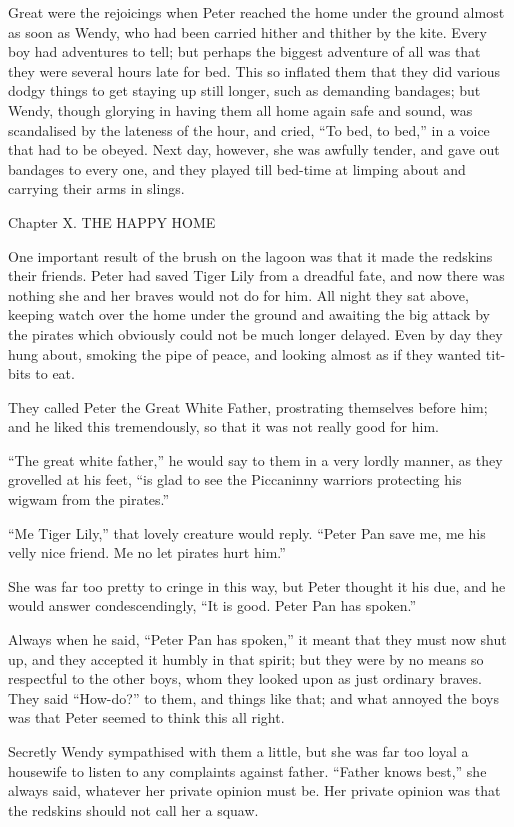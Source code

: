 Great were the rejoicings when Peter reached the home under the ground
almost as soon as Wendy, who had been carried hither and thither by the
kite. Every boy had adventures to tell; but perhaps the biggest
adventure of all was that they were several hours late for bed. This so
inflated them that they did various dodgy things to get staying up
still longer, such as demanding bandages; but Wendy, though glorying in
having them all home again safe and sound, was scandalised by the
lateness of the hour, and cried, ``To bed, to bed,'' in a voice that had
to be obeyed. Next day, however, she was awfully tender, and gave out
bandages to every one, and they played till bed-time at limping about
and carrying their arms in slings.




Chapter X.
THE HAPPY HOME


One important result of the brush on the lagoon was that it made the
redskins their friends. Peter had saved Tiger Lily from a dreadful
fate, and now there was nothing she and her braves would not do for
him. All night they sat above, keeping watch over the home under the
ground and awaiting the big attack by the pirates which obviously could
not be much longer delayed. Even by day they hung about, smoking the
pipe of peace, and looking almost as if they wanted tit-bits to eat.

They called Peter the Great White Father, prostrating themselves before
him; and he liked this tremendously, so that it was not really good for
him.

``The great white father,'' he would say to them in a very lordly manner,
as they grovelled at his feet, ``is glad to see the Piccaninny warriors
protecting his wigwam from the pirates.''

``Me Tiger Lily,'' that lovely creature would reply. ``Peter Pan save me,
me his velly nice friend. Me no let pirates hurt him.''

She was far too pretty to cringe in this way, but Peter thought it his
due, and he would answer condescendingly, ``It is good. Peter Pan has
spoken.''

Always when he said, ``Peter Pan has spoken,'' it meant that they must
now shut up, and they accepted it humbly in that spirit; but they were
by no means so respectful to the other boys, whom they looked upon as
just ordinary braves. They said ``How-do?'' to them, and things like
that; and what annoyed the boys was that Peter seemed to think this all
right.

Secretly Wendy sympathised with them a little, but she was far too
loyal a housewife to listen to any complaints against father. ``Father
knows best,'' she always said, whatever her private opinion must be. Her
private opinion was that the redskins should not call her a squaw.

